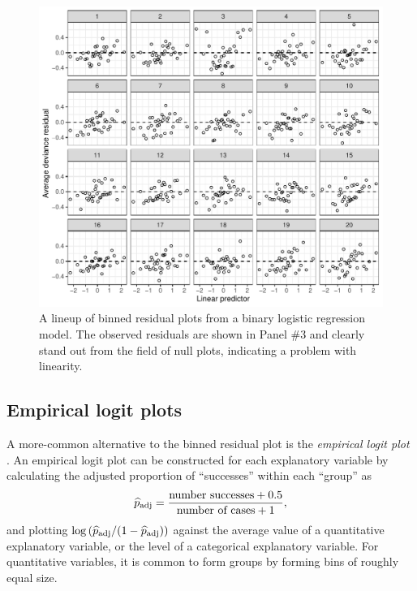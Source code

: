 \documentclass[12pt]{article}
\begin{document}
\begin{figure}
\centering
\includegraphics{figs/lineup_binned_resid.pdf}
\caption{\label{fig:binnedlineup} A lineup of binned residual plots from
a binary logistic regression model. The observed residuals are shown in
Panel \#3 and clearly stand out from the field of null plots, indicating
a problem with linearity.}
\end{figure}

\hypertarget{empirical-logit-plots}{%
\subsection{Empirical logit plots}\label{empirical-logit-plots}}

A more-common alternative to the binned residual plot is the
\emph{empirical logit plot} \citep[see][]{stat2, ramsey2013}. An
empirical logit plot can be constructed for each explanatory variable by
calculating the adjusted proportion of ``successes'' within each
``group'' as \[
\widehat{p}_{\rm adj} = \frac{\text{number successes} + 0.5}{\text{number of cases} + 1},
\] and plotting
\(\log\left(\widehat{p}_{\rm adj} / (1- \widehat{p}_{\rm adj}) \right)\)
against the average value of a quantitative explanatory variable, or the
level of a categorical explanatory variable. For quantitative variables,
it is common to form groups by forming bins of roughly equal size.
\end{document}
